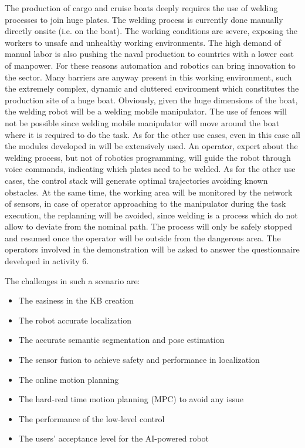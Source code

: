 \begin{planactivitybody}
The production of cargo and cruise boats deeply requires the use of
welding processes to join huge plates. The welding process is currently
done manually directly onsite (i.e. on the boat). The working conditions
are severe, exposing the workers to unsafe and unhealthy working
environments. The high demand of manual labor is also pushing the naval
production to countries with a lower cost of manpower. For these reasons
automation and robotics can bring innovation to the sector. Many
barriers are anyway present in this working environment, such the
extremely complex, dynamic and cluttered environment which constitutes
the production site of a huge boat. Obviously, given the huge dimensions
of the boat, the welding robot will be a welding mobile manipulator. The
use of fences will not be possible since welding mobile manipulator will
move around the boat where it is required to do the task. As for the
other use cases, even in this case all the modules developed in
 will be extensively used. An operator, expert about
the welding process, but not of robotics programming, will guide the
robot through voice commands, indicating which plates need to be welded.
As for the other use cases, the control stack will generate optimal
trajectories avoiding known obstacles. At the same time, the working
area will be monitored by the network of sensors, in case of operator
approaching to the manipulator during the task execution, the replanning
will be avoided, since welding is a process which do not allow to
deviate from the nominal path. The process will only be safely stopped
and resumed once the operator will be outside from the dangerous area.
The operators involved in the demonstration will be asked to answer the
questionnaire developed in activity 6.

The challenges in such a scenario are:

\begin{itemize}
\item
  The easiness in the KB creation
\item
  The robot accurate localization
\item
  The accurate semantic segmentation and pose estimation
\item
  The sensor fusion to achieve safety and performance in localization
\item
  The online motion planning
\item
  The hard-real time motion planning (MPC) to avoid any issue
\item
  The performance of the low-level control
\item
  The users' acceptance level for the AI-powered robot
\end{itemize}
\end{planactivitybody}


